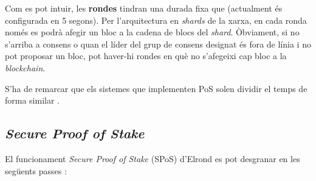 \documentclass[11pt,a4paper]{article}
\begin{document}
Com es pot intuir, les \textbf{rondes} tindran una durada fixa que (actualment és configurada en 5 segons). Per l'arquitectura en \textit{shards} de la xarxa, en cada ronda només es podrà afegir un bloc a la cadena de blocs del \textit{shard}. Òbviament, si no s'arriba a consens o quan el líder del grup de consens designat és fora de línia i no pot proposar un bloc, pot haver-hi rondes en què no s'afegeixi cap bloc a la \textit{blockchain}.

S'ha de remarcar que els sistemes que implementen PoS solen dividir el temps de forma similar \cite{elrond2019}.

\subsection{\textit{Secure Proof of Stake}}
El funcionament \textit{Secure Proof of Stake} (SPoS) d'Elrond es pot desgranar en les següents passes \cite{elrond2022}\cite{elrond2019}: 
\end{document}
